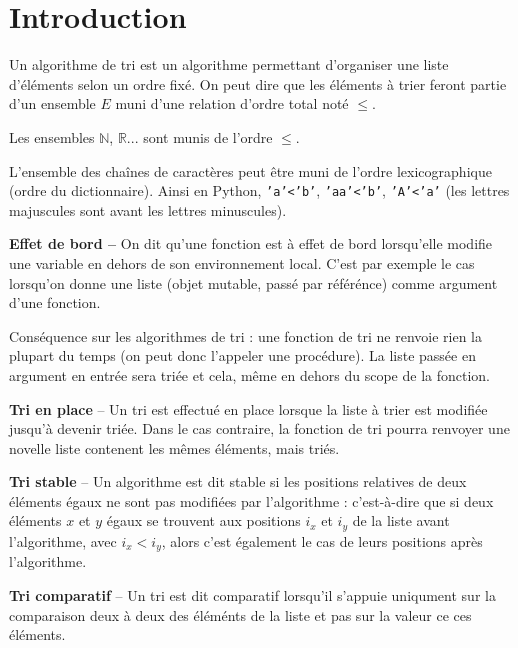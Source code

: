\section{Introduction}
Un algorithme de tri est un algorithme permettant d'organiser une liste d'éléments selon un ordre fixé.  On peut dire que les éléments à trier feront partie d'un ensemble $E$ muni d'une relation d'ordre total noté $\leq$.
\begin{exemple}
Les ensembles $\mathbb{N}$, $\mathbb{R}$... sont munis de l'ordre $\leq$. 

L'ensemble des chaînes de caractères peut être muni de l'ordre lexicographique (ordre du dictionnaire). Ainsi en Python, \texttt{'a'<'b'}, \texttt{'aa'<'b'}, \texttt{'A'<'a'} (les lettres majuscules sont avant les lettres minuscules).
\end{exemple}

\begin{defi}\textbf{Effet de bord -- } On dit qu'une fonction est à effet de bord lorsqu'elle modifie une variable  en dehors de son environnement local. C'est par exemple le cas lorsqu'on donne une liste (objet mutable, passé par référénce) comme argument d'une fonction.

Conséquence sur les algorithmes de tri : une fonction de tri ne renvoie rien la plupart du temps (on peut donc l'appeler une procédure). La liste passée en argument en entrée sera triée et cela, même en dehors du scope de la fonction. 
\end{defi}


\begin{defi}\textbf{Tri en place} -- 
Un tri est effectué en place lorsque la liste à trier est modifiée jusqu'à devenir triée. Dans le cas contraire, la fonction de tri pourra renvoyer une novelle liste contenent les mêmes éléments, mais triés. 
\end{defi}


\begin{defi}\textbf{Tri stable} -- 
Un algorithme est dit stable si les positions relatives de deux éléments égaux ne sont pas
modifiées par l’algorithme : c’est-à-dire que si deux éléments $x$ et $y$ égaux se trouvent aux positions $i_x$ et $i_y$ de
la liste avant l’algorithme, avec $i_x < i_y$, alors c’est également le cas de leurs positions après l’algorithme.
\end{defi}

\begin{defi}\textbf{Tri comparatif} --
Un tri est dit comparatif lorsqu'il s'appuie uniqument sur la comparaison deux à deux des éléménts de la liste et pas sur la valeur ce ces éléments.
\end{defi}

